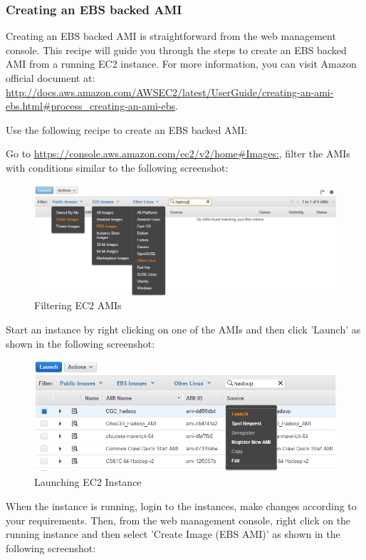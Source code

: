 \subsubsection*{Creating an EBS backed AMI}
Creating an EBS backed AMI is straightforward from the web management console. This recipe will guide you through the steps to create an EBS backed AMI from a running EC2 instance. For more information, you can visit Amazon official document at: \url{http://docs.aws.amazon.com/AWSEC2/latest/UserGuide/creating-an-ami-ebs.html#process_creating-an-ami-ebs}.

Use the following recipe to create an EBS backed AMI:

Go to \url{https://console.aws.amazon.com/ec2/v2/home#Images:}, filter the AMIs with conditions similar to the following screenshot:
\begin{figure}[ht]
  \centering
  \includegraphics[width=.8\textwidth]{figs/5163os_08_29.png}
  \caption{Filtering EC2 AMIs}\label{fig:aws.ec2.ami.filter}
\end{figure} 
Start an instance by right clicking on one of the AMIs and then click 'Launch' as shown in the following screenshot:
\begin{figure}[ht]
  \centering
  \includegraphics[width=.8\textwidth]{figs/5163os_08_30.png}
  \caption{Launching EC2 Instance}\label{fig:aws.launch.instance}
\end{figure} 
When the instance is running, login to the instances, make changes according to your requirements. Then, from the web management console, right click on the running instance and then select 'Create Image (EBS AMI)' as shown in the following screenshot:
